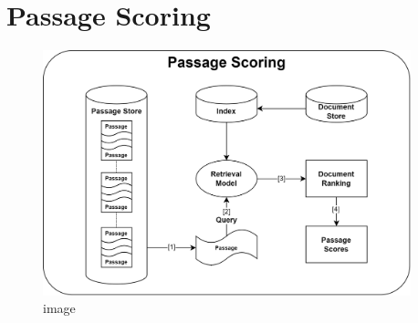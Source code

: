 \section{Passage Scoring}\label{passage-scoring}

\begin{figure}[ht]
    \centering
    \includegraphics[width=0.95\textwidth]{./graphics/drawio/passage_scoring.png}
    \caption{image}
\end{figure}

